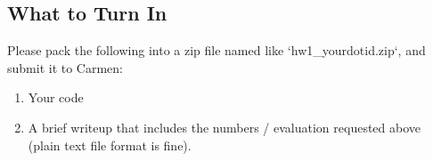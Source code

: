 \documentclass[12pt, letterpaper]{article}
\begin{document}
\subsection*{What to Turn In}

Please pack the following into a zip file named like `hw1\_yourdotid.zip`, and submit it to Carmen:


\begin{enumerate}
  \item Your code
  \item A brief writeup that includes the numbers / evaluation requested above (plain text file format is fine).
\end{enumerate}
\end{document}

